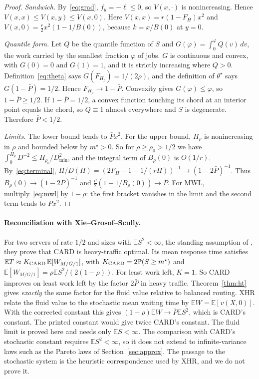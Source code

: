\documentclass[11pt]{article}
\numberwithin{equation}{section}
\theoremstyle{definition}
\theoremstyle{remark}
\newcommand{\E}{\mathbb{E}}
\newcommand{\Prob}{\mathbb{P}}
\begin{document}
\begin{proof}
\emph{Sandwich.} By~\eqref{eq:grad}, $f_y=-\ell\le0$, so $V(x,\cdot)$ is nonincreasing. Hence $V(x,x)\le V(x,y)\le V(x,0)$. Here $V(x,x)=r(1-F_H)x^2$ and $V(x,0)=\frac r2x^2(1-1/B(0))$, because $k=x/B(0)$ at $y=0$.

\emph{Quantile form.} Let $Q$ be the quantile function of $S$ and $G(\varphi)=\int_0^\varphi Q(v)\,dv$, the work carried by the smallest fraction $\varphi$ of jobs. $G$ is continuous and convex, with $G(0)=0$ and $G(1)=1$, and it is strictly increasing where $Q>0$. Definition~\eqref{eq:theta} says $G(F_{H_\rho})=1/(2\rho)$, and the definition of $\theta^\star$ says $G(1-\bar P)=1/2$. Hence $F_{H_\rho}\to1-\bar P$. Convexity gives $G(\varphi)\le\varphi$, so $1-\bar P\ge1/2$. If $1-\bar P=1/2$, a convex function touching its chord at an interior point equals the chord, so $Q\equiv1$ almost everywhere and $S$ is degenerate. Therefore $\bar P<1/2$.

\emph{Limits.} The lower bound tends to $\bar Px^2$. For the upper bound, $H_\rho$ is nonincreasing in $\rho$ and bounded below by $m^\star>0$. So for $\rho\ge\rho_0>1/2$ we have $\int_0^{H_\rho}D^{-2}\le H_{\rho_0}/D_{\min}^2$, and the integral term of $B_\rho(0)$ is $O(1/r)$. By~\eqref{eq:terminal}, $H/D(H)=(2F_H-1-1/(rH))^{-1}\to(1-2\bar P)^{-1}$. Thus $B_\rho(0)\to(1-2\bar P)^{-1}$ and $\frac\rho2(1-1/B_\rho(0))\to\bar P$. For MWL, multiply~\eqref{eq:mwl} by $1-\rho$: the first bracket vanishes in the limit and the second term tends to $\bar Px^2$.
\end{proof}

\paragraph{Reconciliation with Xie--Grosof--Scully.} For two servers of rate $1/2$ and sizes with $\E S^2<\infty$, the standing assumption of \cite[Section~2.1]{XGS2024}, they prove that CARD is heavy-traffic optimal. Its mean response time satisfies $\E T\approx K_{\rm CARD}\,\E[W_{M/G/1}]$, with $K_{\rm CARD}=2\Prob(S\ge m^\star)$ and $\E[W_{M/G/1}]=\rho\E S^2/(2(1-\rho))$. For least work left, $K=1$. So CARD improves on least work left by the factor $2\bar P$ in heavy traffic. Theorem~\ref{thm:ht} gives \emph{exactly} the same factor for the fluid value relative to balanced routing. XHR relate the fluid value to the stochastic mean waiting time by $\E W=\E[v(X,0)]$. With the corrected constant this gives $(1-\rho)\E W\to\bar P\E S^2$, which is CARD's constant. The printed constant would give twice CARD's constant. The fluid limit is proved here and needs only $\E S<\infty$. The comparison with CARD's stochastic constant requires $\E S^2<\infty$, so it does not extend to infinite-variance laws such as the Pareto laws of Section~\ref{sec:approx}. The passage to the stochastic system is the heuristic correspondence used by XHR, and we do not prove it.
\end{document}
